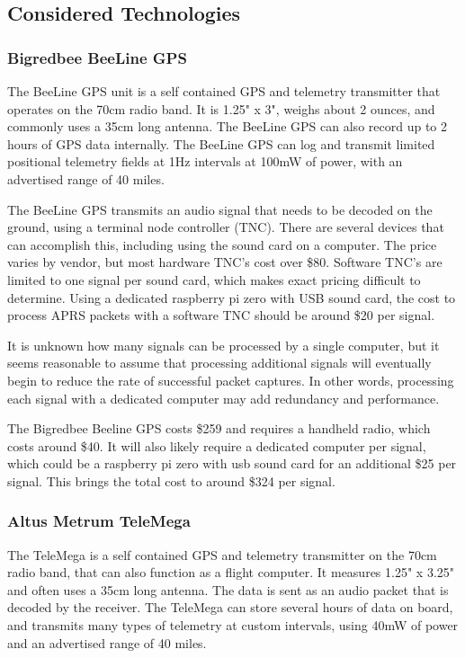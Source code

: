 \documentclass[onecolumn, draftclsnofoot, 10pt, compsoc]{IEEEtran}
\begin{document}
\subsection{Considered Technologies}

\subsubsection{Bigredbee BeeLine GPS}
The BeeLine GPS unit is a self contained GPS and telemetry transmitter that operates on the 70cm radio band.  It is 1.25" x 3", weighs about 2 ounces, and commonly uses a 35cm long antenna.  The BeeLine GPS can also record up to 2 hours of GPS data internally.  The BeeLine GPS can log and transmit limited positional telemetry fields at 1Hz intervals at 100mW of power, with an advertised range of 40 miles.

The BeeLine GPS transmits an audio signal that needs to be decoded on the ground, using a terminal node controller (TNC).  There are several devices that can accomplish this, including using the sound card on a computer.  The price varies by vendor, but most hardware TNC's cost over \$80.  Software TNC's are limited to one signal per sound card, which makes exact pricing difficult to determine.  Using a dedicated raspberry pi zero with USB sound card, the cost to process APRS packets with a software TNC should be around \$20 per signal.

It is unknown how many signals can be processed by a single computer, but it seems reasonable to assume that processing additional signals will eventually begin to reduce the rate of successful packet captures.  In other words, processing each signal with a dedicated computer may add redundancy and performance.

The Bigredbee Beeline GPS costs \$259 and requires a handheld radio, which costs around \$40.  It will also likely require a dedicated computer per signal, which could be a raspberry pi zero with usb sound card for an additional \$25 per signal.  This brings the total cost to around \$324 per signal.

\subsubsection{Altus Metrum TeleMega}
The TeleMega is a self contained GPS and telemetry transmitter on the 70cm radio band, that can also function as a flight computer.  It measures 1.25" x 3.25" and often uses a 35cm long antenna. The data is sent as an audio packet that is decoded by the receiver.  The TeleMega can store several hours of data on board, and transmits many types of telemetry at custom intervals, using 40mW of power and an advertised range of 40 miles.
\end{document}
